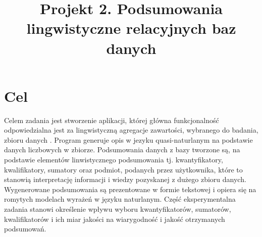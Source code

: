\documentclass{classrep}
\author{
  \studentinfo{Daria Rogowska}{229989} \and
  \studentinfo{Mateusz Srebnik}{230004} }
\title{Projekt 2.  Podsumowania lingwistyczne relacyjnych baz danych}
\begin{document}
\maketitle


\section{Cel}

Celem zadania jest stworzenie aplikacji, której główna funkcjonalność odpowiedzialna jest za lingwistyczną agregacje zawartości, wybranego do badania, zbioru danych \cite{database}. 
Program generuje opis w jezyku quasi-naturlanym na podstawie danych liczbowych w zbiorze. 
Podsumowania danych z bazy tworzone są, na podstawie elementów linwistycznego podsumowania tj. kwantyfikatory, kwalifikatory, sumatory oraz podmiot, podanych przez użytkownika, które to stanowią interpretację informacji i wiedzy pozyskanej z dużego zbioru danych.
Wygenerowane podsumowania są prezentowane w formie tekstowej i opiera się na romytych modelach wyrażeń w języku naturlanym.
Część eksperymentalna zadania stanowi określenie 
wpływu wyboru kwantyfikatorów, sumatorów, kwalifikatorów i ich miar jakości na wiarygodność i jakość otrzymanych podsumowań. 


\end{document}

